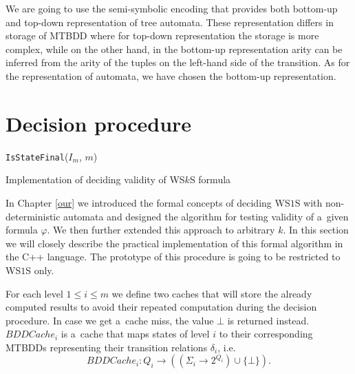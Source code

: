 We are going to use the semi-symbolic encoding that provides both bottom-up and
top-down representation of tree automata. These representation differs in
storage of MTBDD where for top-down representation the storage is more complex,
while on the other hand, in the bottom-up representation arity can be inferred
from the arity of the tuples on the left-hand side of the transition. As for the
representation of automata, we have chosen the bottom-up representation.

 \section{Decision procedure}
 \begin{algorithm}[h!]
		\BlankLine
		\nl\Return \texttt{IsStateFinal}($I_m$, $m$)\;
		\BlankLine
		\caption{Implementation of deciding validity of WS$k$S formula
		}\label{impl-main}
	\end{algorithm}
 
 In Chapter \ref{our} we introduced the formal concepts of deciding WS$1$S
 with non-deterministic automata and designed the algorithm for testing
 validity of a~given formula $\varphi$. We then further extended this approach
 to arbitrary $k$. In this section we will closely describe the practical
 implementation of this formal algorithm in the C++ language. The prototype of
 this procedure is going to be restricted to WS$1$S only.
 
 For each level $1 \leq i \leq m$ we define two caches that will store the
 already computed results to avoid their repeated computation during the
 decision procedure. In case we get a~cache miss, the value $\bot$ is returned
 instead. $\mathit{BDDCache}_i$ is a~cache that maps states of level $i$ to
 their corresponding MTBDDs representing their transition relations $\delta_i$, i.e.
 \begin{equation}
  \mathit{BDDCache}_i : Q_i \rightarrow ((\Sigma_i \rightarrow 2^{Q_i}) \cup
  \{\bot\}).
 \end{equation}
 
